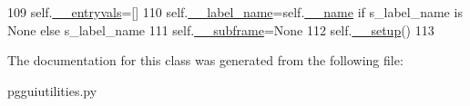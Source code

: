 \begin{DoxyCode}
109         self.\hyperlink{classnegui_1_1pgguiutilities_1_1KeyValFrame_a01ff8dc2236ac230d5349d72cc80663e}{\_\_entryvals}=[]
110         self.\hyperlink{classnegui_1_1pgguiutilities_1_1KeyValFrame_a712bc54aa2ed3383fc4fe78943ed2ccb}{\_\_label\_name}=self.\hyperlink{classnegui_1_1pgguiutilities_1_1KeyValFrame_a08a3969c0310f969954e2b7fdd57a440}{\_\_name} \textcolor{keywordflow}{if} s\_label\_name \textcolor{keywordflow}{is} \textcolor{keywordtype}{None} \textcolor{keywordflow}{else} s\_label\_name
111         self.\hyperlink{classnegui_1_1pgguiutilities_1_1KeyValFrame_a235e50f36bb184384f5890419a5fbe6b}{\_\_subframe}=\textcolor{keywordtype}{None}
112         self.\hyperlink{classnegui_1_1pgguiutilities_1_1KeyValFrame_a9d6430a9f908364c1f00e07b47dcbff5}{\_\_setup}()
113 
\end{DoxyCode}


The documentation for this class was generated from the following file\+:\begin{DoxyCompactItemize}
\item 
pgguiutilities.\+py\end{DoxyCompactItemize}
